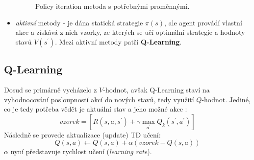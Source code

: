 \begin{itemize}
\begin{figure}[!htbp]
\begin{center}
	\caption{Policy iteration metoda s potřebnými proměnnými.}
	\label{img:policyeval}
\end{center}
\end{figure}

\item \textit{aktivní} metody - je dána statická strategie $\pi(s)$, ale agent provádí vlastní akce a získává z nich vzorky, ze kterých se učí optimální strategie a hodnoty stavů $V(s^\prime)$. Mezi aktivní metody patří \textbf{Q-Learning}.
\end{itemize}

\subsection{Q-Learning}
Dosud se primárně vycházelo z $V$-hodnot, avšak Q-Learning staví na vyhodnocování posloupností akcí do nových stavů, tedy využití $Q$-hodnot. Jediné, co je tedy potřeba vědět je aktuální stav a jeho možné akce \cite{RLIntro}:
\begin{displaymath}
vzorek = \left [ R(s,a,s^\prime)+\gamma \max_{a^\prime}Q_{k}(s^\prime,a^\prime) \right]
\end{displaymath}
Následně se provede aktualizace (update) TD učení:
\begin{displaymath}
 Q(s,a) \leftarrow  Q(s,a) + \alpha(vzorek - Q(s,a))
\end{displaymath}
$\alpha$ nyní představuje rychlost učení (\textit{learning rate}).


